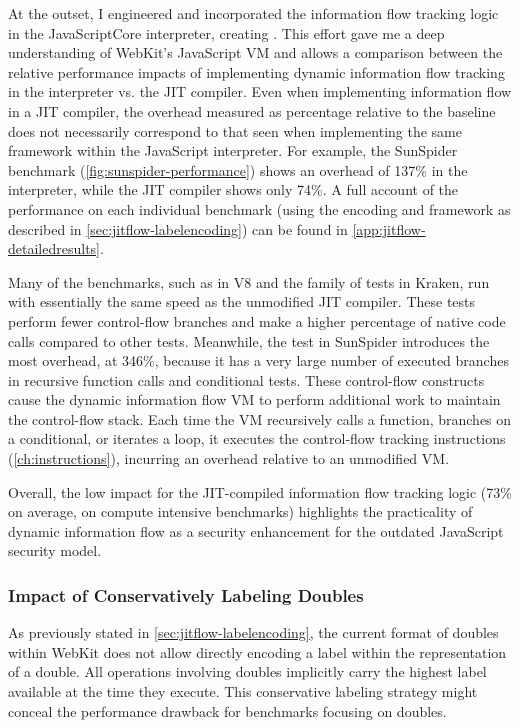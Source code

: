 At the outset, I engineered and incorporated the information flow tracking logic in the JavaScriptCore interpreter, creating \FlowCore.
This effort gave me a deep understanding of WebKit's JavaScript VM and allows a comparison between the relative performance impacts of implementing dynamic information flow tracking in the interpreter vs. the JIT compiler.
Even when implementing information flow in a JIT compiler, the overhead measured as percentage relative to the baseline does not necessarily correspond to that seen when implementing the same framework within the JavaScript interpreter.
For example, the SunSpider benchmark (\autoref{fig:sunspider-performance}) shows an overhead of 137\% in the interpreter, while the JIT compiler shows only 74\%.
A full account of the performance on each individual benchmark (using the encoding and framework as described in \autoref{sec:jitflow-labelencoding}) can be found in \autoref{app:jitflow-detailedresults}.


Many of the benchmarks, such as  in V8 and the  family of tests in Kraken, run with essentially the same speed as the unmodified JIT compiler.
These tests perform fewer control-flow branches and make a higher percentage of native code calls compared to other tests.
Meanwhile, the  test in SunSpider introduces the most overhead, at 346\%, because it has a very large number of executed branches in recursive function calls and conditional tests.
These control-flow constructs cause the dynamic information flow VM to perform additional work to maintain the control-flow stack.
Each time the VM recursively calls a function, branches on a conditional, or iterates a loop, it executes the control-flow tracking instructions (\autoref{ch:instructions}), incurring an overhead relative to an unmodified VM.

Overall, the low impact for the JIT-compiled information flow tracking logic (73\% on average, on compute intensive benchmarks) highlights the practicality of dynamic information flow as a security enhancement for the outdated JavaScript security model.

\subsubsection{Impact of Conservatively Labeling Doubles}
\label{sec:jitflow-impact-doubles}

As previously stated in \autoref{sec:jitflow-labelencoding}, the current format of doubles within WebKit does not allow directly encoding a label within the representation of a double.
All operations involving doubles implicitly carry the highest label available at the time they execute.
This conservative labeling strategy might conceal the performance drawback for benchmarks focusing on doubles.

